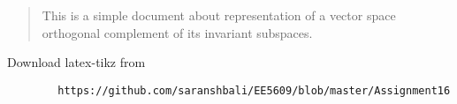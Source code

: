 \documentclass[journal,12pt,twocolumn]{IEEEtran}
\begin{document}
	\maketitle
	\newpage
	\bigskip
	\renewcommand{\thefigure}{\theenumi}
	\renewcommand{\thetable}{\theenumi}
	\begin{abstract}
	This is a simple document about representation of a vector space orthogonal complement of its invariant subspaces.	
	\end{abstract}
	Download latex-tikz from
	\begin{lstlisting}
		https://github.com/saranshbali/EE5609/blob/master/Assignment16
	\end{lstlisting}
\end{document}

